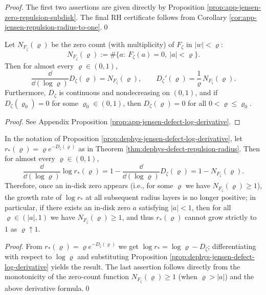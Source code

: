 \begin{proof}
The first two assertions are given directly by Proposition \ref{prop:app-jensen-zero-repulsion-subdisk}.
The final RH certificate follows from Corollary \ref{cor:app-jensen-repulsion-radius-to-one}.\qed
\end{proof}

\begin{proposition}\label{prop:dephys-jensen-defect-log-derivative}
Let \(N_{F_{\zeta}}(\varrho)\) be the zero count (with multiplicity) of \(F_{\zeta}\) in \(|w|<\varrho\):
\[
N_{F_{\zeta}}(\varrho)
:=\#\bigl\{a:\ F_{\zeta}(a)=0,\ |a|<\varrho\bigr\}.
\]
Then for almost every \(\varrho\in(0,1)\),
\[
\frac{\dd}{\dd(\log\varrho)}D_{\zeta}(\varrho)=N_{F_{\zeta}}(\varrho),
\qquad
D_{\zeta}'(\varrho)=\frac{1}{\varrho}\,N_{F_{\zeta}}(\varrho).
\]
Furthermore, \(D_{\zeta}\) is continuous and nondecreasing on \((0,1)\), and if \(D_{\zeta}(\varrho_0)=0\) for some \(\varrho_0\in(0,1)\), then \(D_{\zeta}(\varrho)=0\) for all \(0<\varrho\le \varrho_0\).
\end{proposition}

\begin{proof}
See Appendix Proposition \ref{prop:app-jensen-defect-log-derivative}.
\end{proof}

\begin{corollary}\label{cor:dephys-repulsion-radius-zero-count-driving}
In the notation of Proposition \ref{prop:dephys-jensen-defect-log-derivative}, let \(r_{\ast}(\varrho)=\varrho e^{-D_{\zeta}(\varrho)}\) as in Theorem \ref{thm:dephys-defect-repulsion-radius}.
Then for almost every \(\varrho\in(0,1)\),
\[
\frac{\dd}{\dd(\log\varrho)}\log r_{\ast}(\varrho)
=1-\frac{\dd}{\dd(\log\varrho)}D_{\zeta}(\varrho)
=1-N_{F_{\zeta}}(\varrho).
\]
Therefore, once an in-disk zero appears (i.e., for some \(\varrho\) we have \(N_{F_{\zeta}}(\varrho)\ge 1\)), the growth rate of \(\log r_{\ast}\) at all subsequent radius layers is no longer positive;
in particular, if there exists an in-disk zero \(a\) satisfying \(|a|<1\), then for all \(\varrho\in(|a|,1)\) we have \(N_{F_{\zeta}}(\varrho)\ge 1\), and thus \(r_{\ast}(\varrho)\) cannot grow strictly to \(1\) as \(\varrho\uparrow 1\).
\end{corollary}

\begin{proof}
From \(r_{\ast}(\varrho)=\varrho e^{-D_{\zeta}(\varrho)}\) we get \(\log r_{\ast}=\log\varrho-D_{\zeta}\); differentiating with respect to \(\log\varrho\) and substituting Proposition \ref{prop:dephys-jensen-defect-log-derivative} yields the result.
The last assertion follows directly from the monotonicity of the zero-count function \(N_{F_{\zeta}}(\varrho)\ge 1\) (when \(\varrho>|a|\)) and the above derivative formula.\qed
\end{proof}

